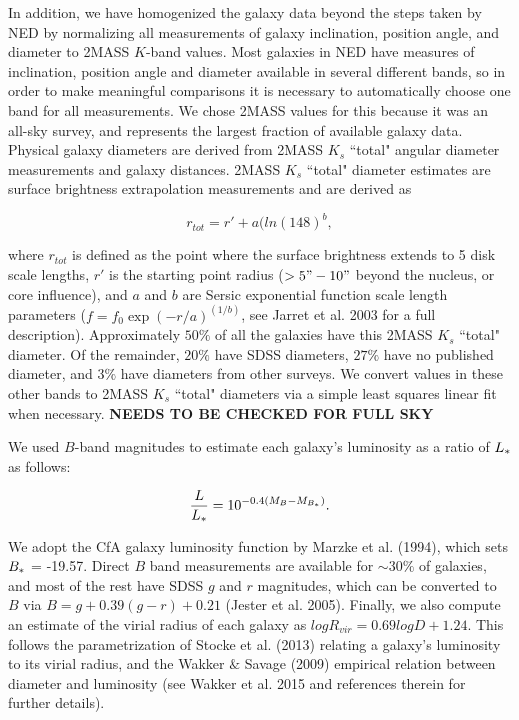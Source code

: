 \documentclass[iop]{emulateapj-rtx4}
\begin{document}
In addition, we have homogenized the galaxy data beyond the steps taken by NED by normalizing all measurements of galaxy inclination, position angle, and diameter to 2MASS $K$-band values. Most galaxies in NED have measures of inclination, position angle and diameter available in several different bands, so in order to make meaningful comparisons it is necessary to automatically choose one band for all measurements. We chose 2MASS values for this because it was an all-sky survey, and represents the largest fraction of available galaxy data. Physical galaxy diameters are derived from 2MASS $K_s$ ``total" angular diameter measurements and galaxy distances. 2MASS $K_s$ ``total" diameter estimates are surface brightness extrapolation measurements and are derived as 

\begin{equation}
r_{tot} = r' + a(ln(148)^b,
\end{equation}

\noindent where $r_{tot}$ is defined as the point where the surface brightness extends to 5 disk scale lengths, $r'$ is the starting point radius ($>5" - 10"$ beyond the nucleus, or core influence), and $a$ and $b$ are Sersic exponential function scale length parameters ($f = f_0 \exp{(-r/a)}^{(1/b)}$, see Jarret et al. 2003 for a full description). Approximately $50\%$ of all the galaxies have this 2MASS $K_s$ ``total" diameter. Of the remainder, $20\%$ have SDSS diameters, $27\%$ have no published diameter, and $3\%$ have diameters from other surveys. We convert values in these other bands to 2MASS $K_s$ ``total" diameters via a simple least squares linear fit when necessary. \textbf{NEEDS TO BE CHECKED FOR FULL SKY}

We used $B$-band magnitudes to estimate each galaxy's luminosity as a ratio of $L_{\**}$ as follows:

\begin{equation}
	\frac{L}{L_{\**}} = 10^{-0.4 (M_{B} - M_{B_{\**}})}.
\end{equation}

We adopt the CfA galaxy luminosity function by Marzke et al. (1994), which sets $B_{\**} $ = -19.57. Direct $B$ band measurements are available for $\sim 30\%$ of galaxies, and most of the rest have SDSS $g$ and $r$ magnitudes, which can be converted to $B$ via $B = g + 0.39 (g-r) + 0.21$ (Jester et al. 2005). Finally, we also compute an estimate of the virial radius of each galaxy as $log R_{vir} = 0.69 log D + 1.24$. This follows the parametrization of Stocke et al. (2013) relating a galaxy's luminosity to its virial radius, and the Wakker $\&$ Savage (2009) empirical relation between diameter and luminosity (see Wakker et al. 2015 and references therein for further details).
\end{document}
